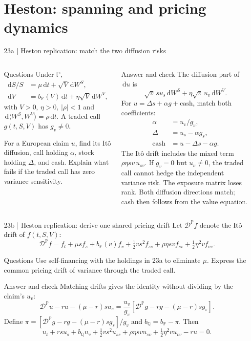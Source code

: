 \documentclass[handout,10pt,t,aspectratio=169]{beamer}
\newcommand{\Q}{\mathbb Q}
\newcommand{\Pp}{\mathbb P}
\newcommand{\dd}{\,\mathrm d}
\newenvironment{questions}{\begin{block}{Questions}}{\end{block}}
\newenvironment{answers}{\begin{exampleblock}{Answer and check}}{\end{exampleblock}}
\newcommand{\compact}{\small%
 \setlength{\abovedisplayskip}{3pt}%
 \setlength{\belowdisplayskip}{3pt}%
 \setlength{\abovedisplayshortskip}{2pt}%
 \setlength{\belowdisplayshortskip}{2pt}%
 \setlength{\parskip}{2pt}}
\begin{document}
\section{Heston: spanning and pricing dynamics}
\begin{frame}{23a | Heston replication: match the two diffusion risks}
\compact
\begin{columns}[T,onlytextwidth]
\begin{questions}
Under \(\Pp\),
\[
 \begin{aligned}
 \dd S/S&=\mu\dd t+\sqrt V\dd W^S,\\
 \dd V&=b_\Pp(V)\dd t+\eta\sqrt V\dd W^V,
 \end{aligned}
\]
with \(V>0,\ \eta>0,\ |\rho|<1\) and
\(\dd\langle W^S,W^V\rangle=\rho\dd t\).
A traded call \(g(t,S,V)\) has \(g_v\ne0\).

For a European claim \(u\), find its It\^o diffusion, call holding \(\alpha\),
stock holding \(\Delta\), and cash.
Explain what fails if the traded call has zero variance sensitivity.
\end{questions}
\begin{answers}
The diffusion part of \(\dd u\) is
\[
 \sqrt v\,s u_s\dd W^S+\eta\sqrt v\,u_v\dd W^V.
\]
For \(u=\Delta s+\alpha g+\text{cash}\), match both coefficients:
\[
 \boxed{\begin{aligned}
 \alpha&=u_v/g_v,\\
 \Delta&=u_s-\alpha g_s,\\
 \text{cash}&=u-\Delta s-\alpha g.
 \end{aligned}}
\]
The It\^o drift includes the mixed term
\(\rho\eta sv\,u_{sv}\).
If \(g_v=0\) but \(u_v\ne0\), the traded call cannot hedge the independent
variance risk. The exposure matrix loses rank.
Both diffusion directions match; cash then follows from the value equation.
\end{answers}
\end{columns}
\end{frame}

\begin{frame}{23b | Heston replication: derive one shared pricing drift}
\compact
Let \(\mathcal D^\Pp f\) denote the It\^o drift of \(f(t,S,V)\):
\[
 \mathcal D^\Pp f=f_t+\mu sf_s+b_\Pp(v)f_v+
 \tfrac12vs^2f_{ss}+\rho\eta svf_{sv}+\tfrac12\eta^2vf_{vv}.
\]
\begin{questions}
Use self-financing with the holdings in 23a to eliminate \(\mu\).
Express the common pricing drift of variance through the traded call.
\end{questions}
\begin{answers}
Matching drifts gives the identity without dividing by the claim's \(u_v\):
\[
 \mathcal D^\Pp u-ru-(\mu-r)su_s
 =\frac{u_v}{g_v}
 [\mathcal D^\Pp g-rg-(\mu-r)sg_s].
\]
Define \(\pi=[\mathcal D^\Pp g-rg-(\mu-r)sg_s]/g_v\) and
\(b_\Q=b_\Pp-\pi\). Then
\[
 \boxed{u_t+rsu_s+b_\Q u_v+\tfrac12vs^2u_{ss}
 +\rho\eta svu_{sv}+\tfrac12\eta^2vu_{vv}-ru=0.}
\]
\end{answers}
\end{frame}
\end{document}
